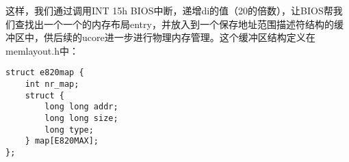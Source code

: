 这样，我们通过调用INT 15h
BIOS中断，递增di的值（20的倍数），让BIOS帮我们查找出一个一个的内存布局entry，并放入到一个保存地址范围描述符结构的缓冲区中，供后续的ucore进一步进行物理内存管理。这个缓冲区结构定义在memlayout.h中：

\begin{lstlisting}
struct e820map {
    int nr_map;
    struct {
        long long addr;
        long long size;
        long type;
    } map[E820MAX];
};
\end{lstlisting}

